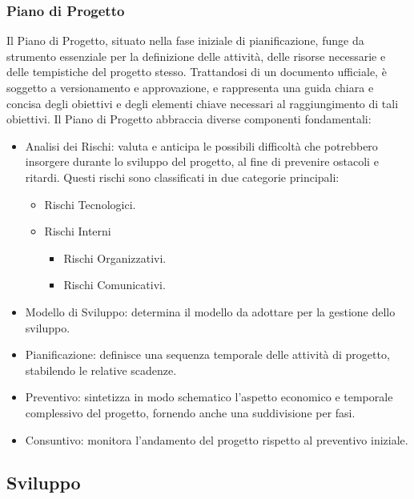 \documentclass{article}
\begin{document}
\subsubsection{Piano di Progetto}
Il Piano di Progetto, situato nella fase iniziale di pianificazione, funge da strumento essenziale per la definizione delle attività, delle risorse necessarie e delle tempistiche del progetto stesso. Trattandosi di un documento ufficiale, è soggetto a versionamento e approvazione, e rappresenta una guida chiara e concisa degli obiettivi e degli elementi chiave necessari al raggiungimento di tali obiettivi.
Il Piano di Progetto abbraccia diverse componenti fondamentali:
\begin{itemize}
    \item Analisi dei Rischi: valuta e anticipa le possibili difficoltà che potrebbero insorgere durante lo sviluppo del progetto, al fine di prevenire ostacoli e ritardi. Questi rischi sono classificati in due categorie principali:
    \begin{itemize}
        \item Rischi Tecnologici.
        \item Rischi Interni
        \begin{itemize}
            \item Rischi Organizzativi.
            \item Rischi Comunicativi.
        \end{itemize}
    \end{itemize}
    \item Modello di Sviluppo: determina il modello da adottare per la gestione dello sviluppo.
    \item Pianificazione: definisce una sequenza temporale delle attività di progetto, stabilendo le relative scadenze.
    \item Preventivo: sintetizza in modo schematico l'aspetto economico e temporale complessivo del progetto, fornendo anche una suddivisione per fasi.
    \item Consuntivo: monitora l'andamento del progetto rispetto al preventivo iniziale.
\end{itemize}


\subsection{Sviluppo}
\end{document}
